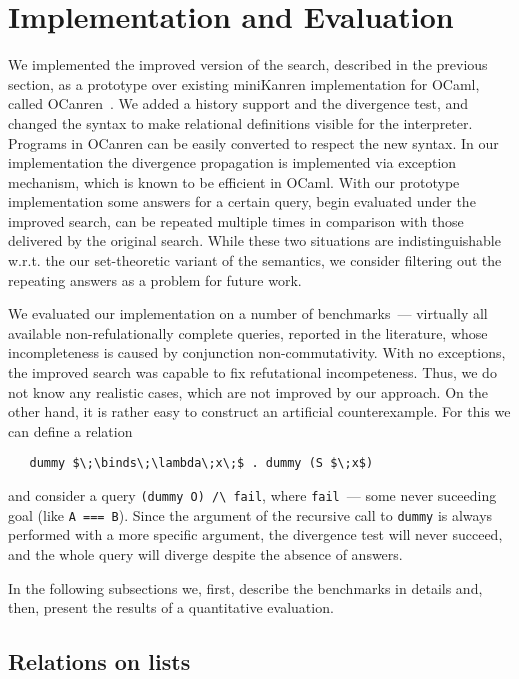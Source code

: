 \section{Implementation and Evaluation}
\label{evaluation}

We implemented the improved version of the search, described in the previous section, 
as a prototype over existing miniKanren implementation for OCaml, called OCanren~\cite{OCanren}. 
We added a history support and the divergence test, and changed the syntax to make relational definitions
visible for the interpreter. Programs in OCanren can be easily converted to respect the new syntax.
In our implementation the divergence propagation is implemented via exception mechanism, which is
known to be efficient in OCaml. With our prototype implementation some answers for a certain query, begin
evaluated under the improved search, can be repeated multiple times in comparison with those delivered by the
original search. While these two situations are indistinguishable w.r.t. the our set-theoretic variant of the semantics,
we consider filtering out the repeating answers as a problem for future work.

We evaluated our implementation on a number of benchmarks~--- virtually all available non-refulationally
complete queries, reported in the literature, whose incompleteness is caused by conjunction non-commutativity.
With no exceptions, the improved search was capable to fix refutational incompeteness. Thus, we do not know any
realistic cases, which are not improved by our approach. On the other hand, it is rather easy to construct
an artificial counterexample. For this we can define a relation

\begin{lstlisting}
   dummy $\;\binds\;\lambda\;x\;$ . dummy (S $\;x$)
\end{lstlisting}

\noindent and consider a query \lstinline|(dummy O) /\ fail|, where \lstinline|fail|~--- some never
suceeding goal (like \lstinline|A === B|). Since the argument of the recursive call to \lstinline|dummy| is
always performed with a more specific argument, the divergence test will never succeed, and the whole
query will diverge despite the absence of answers. 

In the following subsections we, first, describe the benchmarks in details and, then, present the
results of a quantitative evaluation.

\subsection{Relations on lists}

